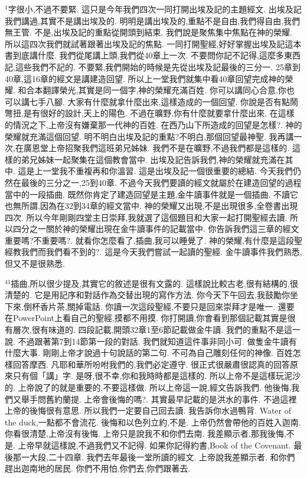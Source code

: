 \documentclass{book}
\begin{document}
$^{1}$字很小,不過不要緊.
這只是今年我們四次一同打開出埃及記的主題經文.
出埃及記我們講過,其實不是講出埃及的.
明明是講出埃及的,重點不是自由,我們得自由,我們無王管.
不是,出埃及記的重點從開頭到結束.
我們說是聚焦集中焦點在神的榮耀.
所以這四次我們就試著跟著出埃及記的焦點.
一同打開聖經,好好掌握出埃及記這本書到底講什麼.
我們從尾講上頭,我們從40章上一次.
不要問你記不記得,這麼多東西記,這些我們不記的.
不要緊,我們開始的時候是先從出埃及記最後的三分一.
25章到40章,這16章的經文是講建造回望.
所以上一堂我們就集中看40章回望完成神的榮耀.
和合本翻譯榮光,其實是同一個字,神的榮耀充滿百姓.
你可以講同心合意,你也可以講七手八腳.
大家有什麼就拿什麼出來,這樣造成的一個回望.
你說是否有點鬧彆扭,是有很好的設計,天上的陽色.
不過在曠野,你有什麼就要拿什麼出來.
在這樣的情況之下,上帝沒有嫌棄那一代神的百姓.
在西乃山下所造成的回望是怎樣?.
神的榮耀就充滿這個回望.
明不明白出埃及記的重點?不明白,那個回望最神聖.
我再講一次,在廣恩堂上帝招聚我們這班弟兄姊妹.
我們不是在曠野,不過我們都是這樣的.
這樣的弟兄姊妹一起聚集在這個教會當中.
出埃及記告訴我們,神的榮耀就充滿在其中.
這是上一堂我不重複再和你溫習.
這是出埃及記一個很重要的總結.
今天我們仍然在最後的三分之一,25到40章.
不過今天我們要讀的經文就屬於在建造回望的過程當中的一段插曲.
既然你肯定了建造回望是主題,金牛讀事件就是一個插曲.
不讀它也無所謂,因為在32到34章的經文當中.
神的榮耀又出現,不是出現很多,全卷書出現四次.
所以今年剛剛四堂主日崇拜,我就選了這個題目和大家一起打開聖經去讀.
所以四分之一關於神的榮耀出現在金牛讀事件的記載當中.
你告訴我們這三章的經文重要嗎?不重要嗎?.
就看你怎麼看了,插曲,我可以睡覺了.
神的榮耀,有什麼是這段聖經教我們而我們看不到的?.
這是今天我們嘗試一起讀的聖經.
金牛讀事件我們熟悉,但又不是很熟悉.

$^{41}$插曲,所以很少提及,其實它的敘述是很有文露的.
這樣說比較古老,很有結構的,很清楚的.
它是用記序和對話作為交替出現的寫作方法.
你今天下午回去,我鼓勵你坐下來,倒杯香片茶,關掉電話.
你讀一次這段聖經,不要只是回來崇拜才是唯一.
還要在PowerPoint上看自己的聖經,摸都不用摸.
你打開讀,你會看到那個記載其實是很有層次,很有味道的.
四段記載,開頭32章1至6節記載做金牛讀.
我們的重點不是這一說.
不過跟著第7到14節第一段的對話.
我們就知道這件事非同小可.
做隻金牛讀有什麼大事.
剛剛上帝才說過十句說話的第二句.
不可為自己雕刻任何的神像.
百姓怎樣回答摩西.
凡耶和華所吩咐我們的,我們必定遵守.
很正式很嚴肅很認真的回答原來只有個「講」字.
是呀,很不幸,你和我時時都是這樣的.
所以上帝不是這樣玩泥沙的.
上帝說了的就是重要的,不要這樣做.
所以上帝這一說,經文告訴我們.
他後悔,我們又舉手問舊約蘭提.
上帝會後悔的嗎?.
其實最早記載的是洪水的事件.
不過這裡上帝的後悔很有意思.
所以我們一定要自己回去讀.
我告訴你水過鴨背.
Water of the duck,一點都不會流花.
後悔和以色列立約,不是.
上帝仍然會帶他的百姓入迦南.
你看很清楚,上帝沒有後悔.
上帝只是說我不和你們去南.
我差顯示者,那我後悔,不是.
上帝早就這樣說,不過我們又不記得.
如果你記得約書,Book of the Covenant.
最後那一大段,二十四章.
我們去年最後一堂所讀的經文.
上帝說我差顯示者.
和你們趕出迦南地的居民.
你們不用怕,你們去,你們跟著去.
\end{document}

